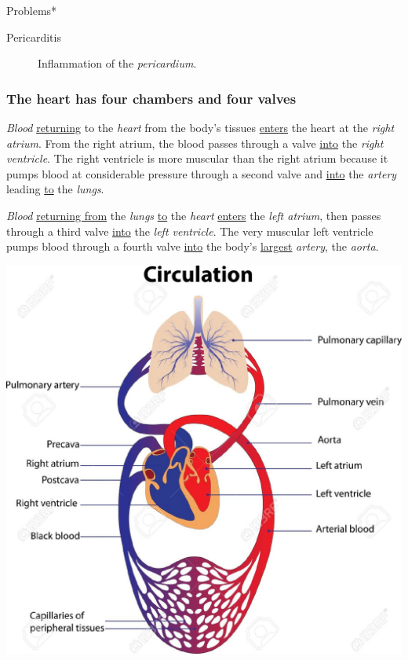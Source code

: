\documentclass[11pt]{article}
\begin{document}
Problems*

\begin{description}
\item[{Pericarditis}] Inflammation of the \emph{pericardium}.
\end{description}

\subsubsection{The heart has four chambers and four valves}
\label{sec:org036e012}
\emph{Blood} \uline{returning} to the \emph{heart} from the body's tissues \uline{enters} the heart at the
\emph{right atrium}. From the right atrium, the blood passes through a valve \uline{into}
the \emph{right ventricle}. The right ventricle is more muscular than the right
atrium because it pumps blood at considerable pressure through a second
valve and \uline{into} the \emph{artery} leading \uline{to} the \emph{lungs}.

\emph{Blood} \uline{returning from} the \emph{lungs} \uline{to} the \emph{heart} \uline{enters} the \emph{left atrium}, then
passes through a third valve \uline{into} the \emph{left ventricle}. The very muscular left
ventricle pumps blood through a fourth valve \uline{into} the body's \uline{largest} \emph{artery},
the \emph{aorta}.

\begin{center}
\includegraphics[width=.9\linewidth]{Ch. 8/13453870-Schematic-representation-of-the-human-circulatory-system-Poster-Stock-Vector_2016-10-25_23-00-21.jpg}
\end{center}
\end{document}
